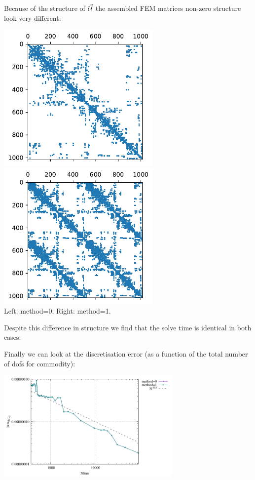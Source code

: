 Because of the structure of $\vec{\cal U}$ the assembled FEM matrices 
non-zero structure look very different:
\begin{center}
\includegraphics[width=8cm]{python_codes/fieldstone_179/RESULTS/matrix0.pdf}
\includegraphics[width=8cm]{python_codes/fieldstone_179/RESULTS/matrix1.pdf}\\
{\captionfont Left: method=0; Right: method=1.}
\end{center}
Despite this difference in structure we find that the solve time is identical
in both cases.

Finally we can look at the discretisation error (as a function of 
the total number of dofs for commodity):
\begin{center}
\includegraphics[width=9cm]{python_codes/fieldstone_179/RESULTS/erru.pdf}
\end{center}




